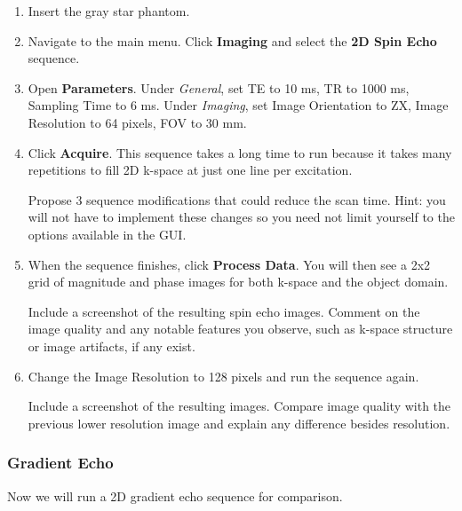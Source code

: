 \begin{enumerate}
    \item Insert the gray star phantom.
    \item Navigate to the main menu. Click \textbf{Imaging} and select the \textbf{2D Spin Echo} sequence.
    \item Open \textbf{Parameters}. Under \emph{General}, set TE to 10 ms, TR to 1000 ms, Sampling Time to 6 ms. Under \emph{Imaging}, set Image Orientation to ZX, Image Resolution to 64 pixels, FOV to 30 mm.
    \item Click \textbf{Acquire}. This sequence takes a long time to run because it takes many repetitions to fill 2D k-space at just one line per excitation.
    
\noindent{}\color{red}
Propose 3 sequence modifications that could reduce the scan time. Hint: you will not have to implement these changes so you need not limit yourself to the options available in the GUI.
\color{black}  

    \item When the sequence finishes, click \textbf{Process Data}. You will then see a 2x2 grid of magnitude and phase images for both k-space and the object domain.

\noindent{}\color{red}Include a screenshot of the resulting spin echo images. Comment on the image quality and any notable features you observe, such as k-space structure or image artifacts, if any exist.
\noindent{}\color{black}

    \item Change the Image Resolution to 128 pixels and run the sequence again.

\noindent{}\color{red}
Include a screenshot of the resulting images. Compare image quality with the previous lower resolution image and explain any difference besides resolution.
\noindent{}\color{black}


\color{black}

\end{enumerate}

\subsubsection{Gradient Echo}
Now we will run a 2D gradient echo sequence for comparison. 

